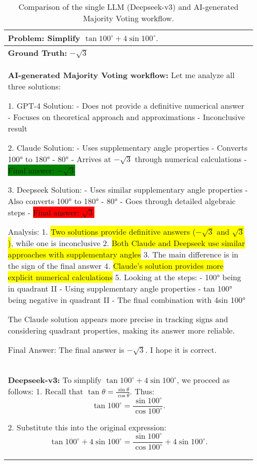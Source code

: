 \begin{longtable}{p{15cm}}
\caption{Comparison of the single LLM (Deepseek-v3) and AI-generated Majority Voting workflow.}
\label{tab:workflow_error}\\
\toprule
\textbf{Problem:} Simplify $\tan 100^\circ + 4 \sin 100^\circ.$ \\
\midrule
\textbf{Ground Truth:} $-\sqrt{3}$ \\
\midrule
\textbf{AI-generated Majority Voting workflow:} Let me analyze all three solutions:

1. GPT-4 Solution:
- Does not provide a definitive numerical answer
- Focuses on theoretical approach and approximations
- Inconclusive result

2. Claude Solution:
- Uses supplementary angle properties
- Converts 100° to 180° - 80°
- Arrives at \(-\sqrt{3}\) through numerical calculations
- \colorbox{green}{Final answer: \(-\sqrt{3}\)}

3. Deepseek Solution:
- Uses similar supplementary angle properties
- Also converts 100° to 180° - 80°
- Goes through detailed algebraic steps
- \colorbox{red}{Final answer: \(\sqrt{3}\)}

Analysis:
1. \colorbox{yellow}{Two solutions provide definitive answers (\(-\sqrt{3}\) and \(\sqrt{3}\))}, while one is inconclusive
2. \colorbox{yellow}{Both Claude and Deepseek use similar approaches with supplementary angles}
3. The main difference is in the sign of the final answer
4. \colorbox{yellow}{Claude's solution provides more explicit numerical calculations}
5. Looking at the steps:
   - 100° being in quadrant II
   - Using supplementary angle properties
   - tan 100° being negative in quadrant II
   - The final combination with 4sin 100°

The Claude solution appears more precise in tracking signs and considering quadrant properties, making its answer more reliable.

Final Answer: The final answer is $-\sqrt{3}$. I hope it is correct. \\ 
\midrule
\textbf{Deepseek-v3:} To simplify \(\tan 100^\circ + 4 \sin 100^\circ\), we proceed as follows:
1. Recall that \(\tan \theta = \frac{\sin \theta}{\cos \theta}\). Thus:
   \[
   \tan 100^\circ = \frac{\sin 100^\circ}{\cos 100^\circ}.
   \]

2. Substitute this into the original expression:
   \[
   \tan 100^\circ + 4 \sin 100^\circ = \frac{\sin 100^\circ}{\cos 100^\circ} + 4 \sin 100^\circ.
   \]


\end{longtable}

